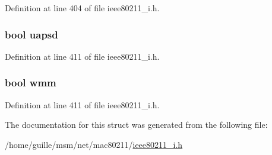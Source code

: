 Definition at line 404 of file ieee80211\-\_\-i.\-h.

\hypertarget{structieee80211__mgd__assoc__data_a079aedf53e144c3df9b110cf96da2297}{
\subsubsection[{uapsd}]{\setlength{\rightskip}{0pt plus 5cm}bool uapsd}}\label{structieee80211__mgd__assoc__data_a079aedf53e144c3df9b110cf96da2297}


Definition at line 411 of file ieee80211\-\_\-i.\-h.

\hypertarget{structieee80211__mgd__assoc__data_aad05de440eb553bb720ef95bd3ed964c}{
\subsubsection[{wmm}]{\setlength{\rightskip}{0pt plus 5cm}bool wmm}}\label{structieee80211__mgd__assoc__data_aad05de440eb553bb720ef95bd3ed964c}


Definition at line 411 of file ieee80211\-\_\-i.\-h.



The documentation for this struct was generated from the following file\-:\begin{DoxyCompactItemize}
\item 
/home/guille/msm/net/mac80211/\hyperlink{ieee80211__i_8h}{ieee80211\-\_\-i.\-h}\end{DoxyCompactItemize}
